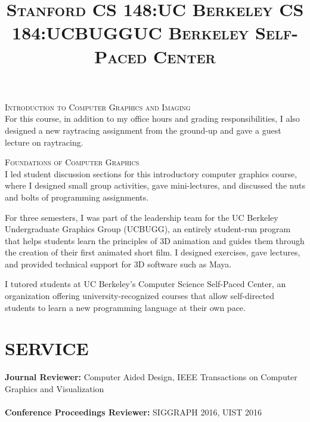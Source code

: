 \documentclass[line,margin]{res}
\begin{document}
\begin{resume}
\title{\textsc{Stanford CS 148:}}
\begin{position}
\textsc{Introduction to Computer Graphics and Imaging}\\
For this course, in addition to my office hours and grading responsibilities, I also designed a new raytracing assignment from the ground-up and gave a guest lecture on raytracing.
\end{position}

\title{\textsc{UC Berkeley CS 184:}}
\begin{position}
\textsc{Foundations of Computer Graphics}\\
I led student discussion sections for this introductory computer graphics course, where I designed small group activities, gave mini-lectures, and discussed the nuts and bolts of programming assignments.
\end{position}

\title{\textsc{UCBUGG}}
\begin{position}
For three semesters, I was part of the leadership team for the UC Berkeley Undergraduate Graphics Group (UCBUGG), an entirely student-run program that helps students learn the principles of 3D animation and guides them through the creation of their first animated short film. I designed exercises, gave lectures, and provided technical support for 3D software such as Maya.
\end{position}

\title{\textsc{UC Berkeley Self-Paced Center}}
\begin{position}
I tutored students at UC Berkeley's Computer Science Self-Paced Center, an organization offering university-recognized courses that allow self-directed students to learn a new programming language at their own pace.
\end{position}


\section{SERVICE}

\textbf{Journal Reviewer: } Computer Aided Design, IEEE Transactions on Computer Graphics and Visualization
\\ \\
\textbf{Conference Proceedings Reviewer: } SIGGRAPH 2016, UIST 2016





\end{resume}
\end{document}
